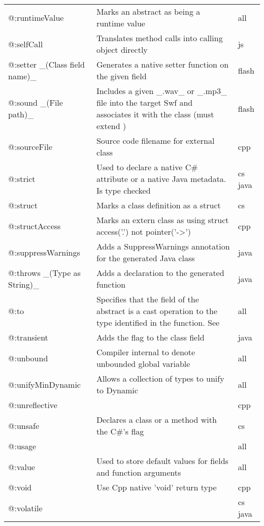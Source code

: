 \begin{center}
\begin{tabular}{| l | l | l |}
	@:runtimeValue  &  Marks an abstract as being a runtime value  &  all \\
	@:selfCall  &  Translates method calls into calling object directly  &  js \\
	@:setter \_(Class field name)\_  &  Generates a native setter function on the given field   &  flash \\
	@:sound \_(File path)\_  &  Includes a given \_.wav\_ or \_.mp3\_ file into the target Swf and associates it with the class (must extend \expr{flash.media.Sound})  &  flash \\
	@:sourceFile  &  Source code filename for external class  &  cpp \\
	@:strict  &  Used to declare a native C# attribute or a native Java metadata. Is type checked  &  cs java \\
	@:struct  &  Marks a class definition as a struct   &  cs \\
	@:structAccess  &  Marks an extern class as using struct access('.') not pointer('->')  &  cpp \\
	@:suppressWarnings  &  Adds a SuppressWarnings annotation for the generated Java class  &  java \\
	@:throws \_(Type as String)\_  &  Adds a \expr{throws} declaration to the generated function   &  java \\
	@:to  &  Specifies that the field of the abstract is a cast operation to the type identified in the function. See \tref{Implicit Casts}{types-abstract-implicit-casts} & all \\
	@:transient  &  Adds the \expr{transient} flag to the class field  &  java \\
	@:unbound  &  Compiler internal to denote unbounded global variable  &  all \\
	@:unifyMinDynamic  &  Allows a collection of types to unify to Dynamic  &  all \\
	@:unreflective  &    &  cpp \\
	@:unsafe  &  Declares a class  or a method with the C\#'s \expr{unsafe} flag   &  cs \\
	@:usage  &    &  all \\
	@:value  &  Used to store default values for fields and function arguments  &  all \\
	@:void  &  Use Cpp native 'void' return type  &  cpp \\
	@:volatile  &    &  cs  java \\
\end{tabular}
\end{center}

